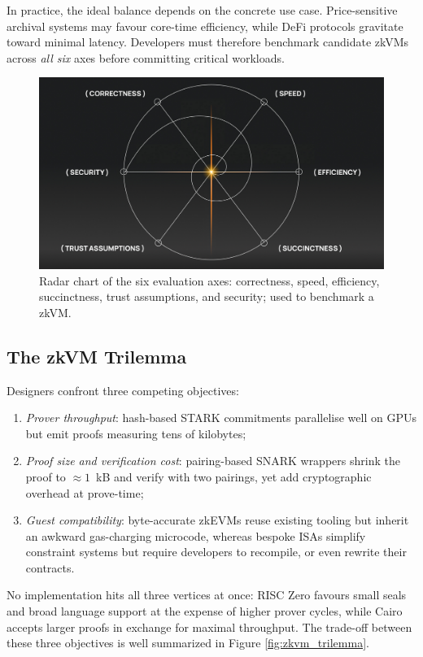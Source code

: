 In practice, the ideal balance depends on the concrete use case.  
Price-sensitive archival systems may favour core-time efficiency, while DeFi protocols gravitate toward minimal latency.  
Developers must therefore benchmark candidate zkVMs across \textit{all six} axes before committing critical workloads.

\begin{figure}[h]
  \centering
  \includegraphics[width=0.8\linewidth]{Images/Chap1/zkVM_axes.png}
  \caption{Radar chart of the six evaluation axes: correctness, speed, efficiency, succinctness, trust assumptions, and security; used to benchmark a zkVM. \cite{lita_zkvm_part1}}
\end{figure}


\subsection{The zkVM Trilemma}
Designers confront three competing objectives:
\begin{enumerate}
  \item \textit{Prover throughput}: hash-based STARK commitments parallelise well on GPUs but emit proofs measuring tens of kilobytes;
  \item \textit{Proof size and verification cost}: pairing-based SNARK wrappers shrink the proof to \(\approx1\)\, kB and verify with two pairings, yet add cryptographic overhead at prove-time;
  \item \textit{Guest compatibility}: byte-accurate zkEVMs reuse existing tooling but inherit an awkward gas-charging microcode, whereas bespoke ISAs simplify constraint systems but require developers to recompile, or even rewrite their contracts.
\end{enumerate}
No implementation hits all three vertices at once: RISC Zero favours small seals and broad language support at the expense of higher prover cycles, while Cairo accepts larger proofs in exchange for maximal throughput.  
The trade-off between these three objectives is well summarized in Figure \ref{fig:zkvm_trilemma}.

